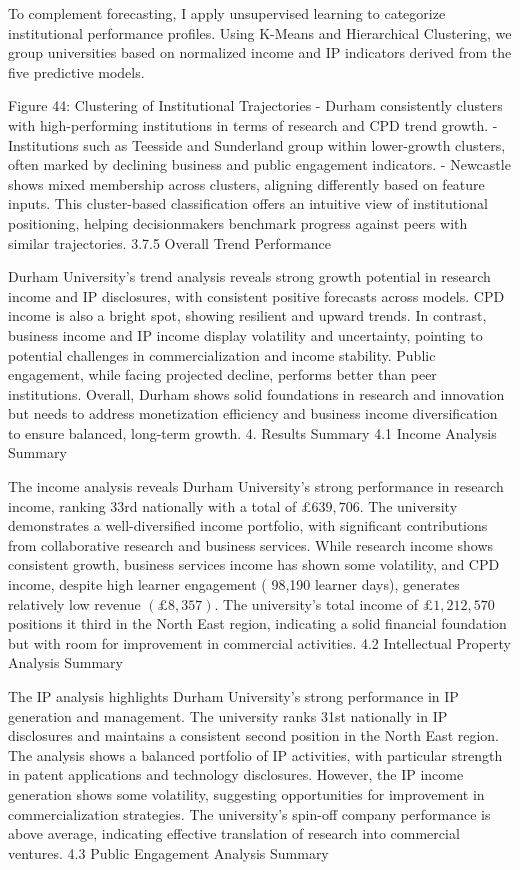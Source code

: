 To complement forecasting, I apply unsupervised learning to categorize institutional performance profiles. Using K-Means and Hierarchical Clustering, we group universities based on normalized income and IP indicators derived from the five predictive models.

Figure 44: Clustering of Institutional Trajectories
- Durham consistently clusters with high-performing institutions in terms of research and CPD trend growth.
- Institutions such as Teesside and Sunderland group within lower-growth clusters, often marked by declining business and public engagement indicators.
- Newcastle shows mixed membership across clusters, aligning differently based on feature inputs. This cluster-based classification offers an intuitive view of institutional positioning, helping decisionmakers benchmark progress against peers with similar trajectories.
3.7.5 Overall Trend Performance

Durham University's trend analysis reveals strong growth potential in research income and IP disclosures, with consistent positive forecasts across models. CPD income is also a bright spot, showing resilient and upward trends. In contrast, business income and IP income display volatility and uncertainty, pointing to potential challenges in commercialization and income stability. Public engagement, while facing projected decline, performs better than peer institutions. Overall, Durham shows solid foundations in research and innovation but needs to address monetization efficiency and business income diversification to ensure balanced, long-term growth.
4. Results Summary
4.1 Income Analysis Summary

The income analysis reveals Durham University's strong performance in research income, ranking 33rd nationally with a total of $£ 639,706$. The university demonstrates a well-diversified income portfolio, with significant contributions from collaborative research and business services. While research income shows consistent growth, business services income has shown some volatility, and CPD income, despite high learner engagement ( 98,190 learner days), generates relatively low revenue $(£ 8,357)$. The university's total income of $£ 1,212,570$ positions it third in the North East region, indicating a solid financial foundation but with room for improvement in commercial activities.
4.2 Intellectual Property Analysis Summary

The IP analysis highlights Durham University's strong performance in IP generation and management. The university ranks 31st nationally in IP disclosures and maintains a consistent second position in the North East region. The analysis shows a balanced portfolio of IP activities, with particular strength in patent applications and technology disclosures. However, the IP income generation shows some volatility, suggesting opportunities for improvement in commercialization strategies. The university's spin-off company performance is above average, indicating effective translation of research into commercial ventures.
4.3 Public Engagement Analysis Summary

